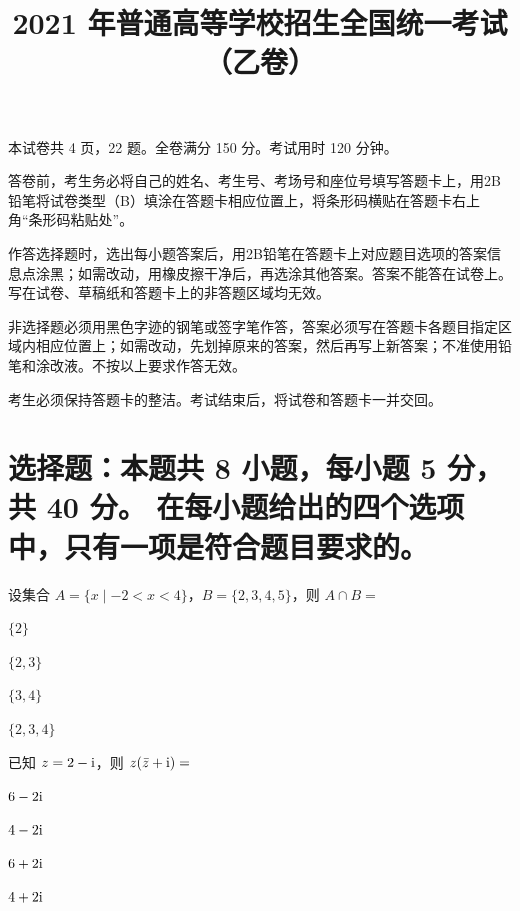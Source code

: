 \documentclass{exam-zh}
\title{2021 年普通高等学校招生全国统一考试（乙卷）}
\begin{document}

\secret

\maketitle

本试卷共 4 页，22 题。全卷满分 150 分。考试用时 120 分钟。


\begin{notice}
  \item 答卷前，考生务必将自己的姓名、考生号、考场号和座位号填写答题卡上，用2B铅笔将试卷类型（B）填涂在答题卡相应位置上，将条形码横贴在答题卡右上角“条形码粘贴处”。
  \item 作答选择题时，选出每小题答案后，用2B铅笔在答题卡上对应题目选项的答案信息点涂黑；如需改动，用橡皮擦干净后，再选涂其他答案。答案不能答在试卷上。
    写在试卷、草稿纸和答题卡上的非答题区域均无效。
  \item 非选择题必须用黑色字迹的钢笔或签字笔作答，答案必须写在答题卡各题目指定区域内相应位置上；如需改动，先划掉原来的答案，然后再写上新答案；不准使用铅笔和涂改液。不按以上要求作答无效。
  \item 考生必须保持答题卡的整洁。考试结束后，将试卷和答题卡一并交回。
\end{notice}



\section{%
  选择题：本题共 8 小题，每小题 5 分，共 40 分。
  在每小题给出的四个选项中，只有一项是符合题目要求的。
}

\begin{question}[points = 2]
  设集合 $A = \{x \mid -2 < x < 4\}$，$B = \{2, 3, 4, 5\}$，则 $A \cap B = $ \paren[B]

  \begin{choices}
    \item $\{2\}$
    \item $\{2, 3\}$
    \item $\{3, 4\}$
    \item $\{2, 3, 4\}$
  \end{choices}
\end{question}

\begin{question}
  已知 $z = 2 - \mathrm{ i }$，则 $z (\bar{z} + \mathrm{ i }) = $ \paren[C]
  \begin{choices}
    \item $6 - 2\mathrm{ i }$
    \item $4 - 2\mathrm{ i }$
    \item $6 + 2\mathrm{ i }$
    \item $4 + 2\mathrm{ i }$
  \end{choices}
\end{question}
\end{document}
